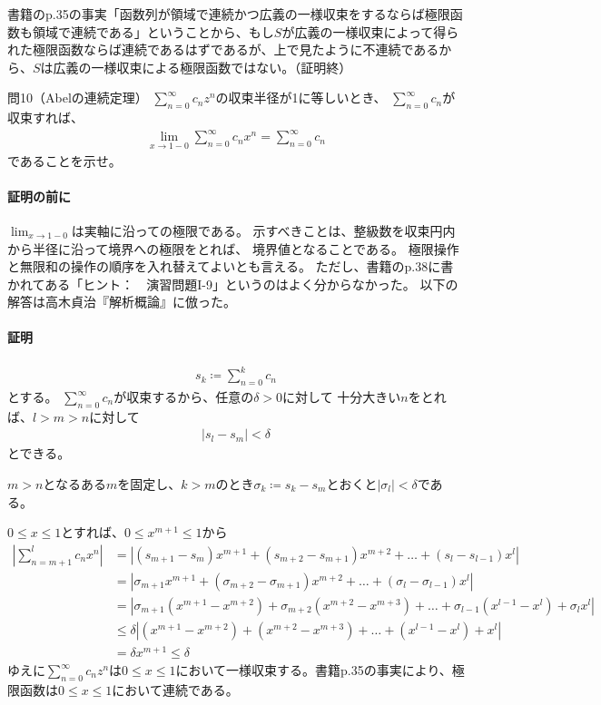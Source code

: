 書籍のp.35の事実「函数列が領域で連続かつ広義の一様収束をするならば極限函数も領域で連続である」ということから、もし$S$が広義の一様収束によって得られた極限函数ならば連続であるはずであるが、上で見たように不連続であるから、$S$は広義の一様収束による極限函数ではない。（証明終）

\begin{mysimplebox}{問10（Abelの連続定理）}
    $\sum_{n=0}^{\infty}c_nz^n$の収束半径が1に等しいとき、
    $\sum_{n=0}^{\infty}c_n$が収束すれば、
    \begin{align*}
        \lim_{x\to 1-0}\sum_{n=0}^{\infty}c_nx^n=\sum_{n=0}^{\infty}c_n
    \end{align*}
    であることを示せ。
\end{mysimplebox}
\paragraph{証明の前に}
$\lim_{x\to 1-0}$は実軸に沿っての極限である。
示すべきことは、整級数を収束円内から半径に沿って境界への極限をとれば、
境界値となることである。
極限操作と無限和の操作の順序を入れ替えてよいとも言える。
ただし、書籍のp.38に書かれてある「ヒント：　演習問題I-9」というのはよく分からなかった。
以下の解答は高木貞治『解析概論』に倣った。

\paragraph{証明}
\begin{align*}
    s_k\coloneqq\sum_{n=0}^{k}c_n
\end{align*}
とする。
$\sum_{n=0}^{\infty}c_n$が収束するから、任意の$\delta>0$に対して
十分大きい$n$をとれば、$l>m>n$に対して
\begin{align*}
    |s_l-s_m|<\delta
\end{align*}
とできる。

$m>n$となるある$m$を固定し、$k>m$のとき$\sigma_k\coloneqq s_k-s_m$とおくと$|\sigma_l|<\delta$である。

$0\le x\le 1$とすれば、$0\le x^{m+1}\le 1$から
\begin{align*}
    \left|\sum_{n=m+1}^{l}c_nx^n\right|
    &=\left|(s_{m+1}-s_m)x^{m+1}+(s_{m+2}-s_{m+1})x^{m+2}+\dots+(s_l-s_{l-1})x^l\right|\\
    &=\left|\sigma_{m+1}x^{m+1}+(\sigma_{m+2}-\sigma_{m+1})x^{m+2}+\dots+(\sigma_l-\sigma_{l-1})x^l\right|\\
    &=\left|\sigma_{m+1}(x^{m+1}-x^{m+2})+\sigma_{m+2}(x^{m+2}-x^{m+3})+\dots+\sigma_{l-1}(x^{l-1}-x^l)+\sigma_lx^l\right|\\
    &\le\delta\left|(x^{m+1}-x^{m+2})+(x^{m+2}-x^{m+3})+\dots+(x^{l-1}-x^l)+x^l\right|\\
    &=\delta x^{m+1}\le\delta
\end{align*}
ゆえに$\sum_{n=0}^{\infty}c_nz^n$は$0\le x\le 1$において一様収束する。書籍p.35の事実により、極限函数は$0\le x\le 1$において連続である。

